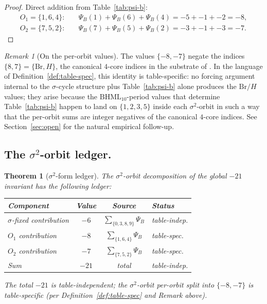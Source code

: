 \documentclass[11pt,reqno]{amsart}
\theoremstyle{plain}
\newtheorem{theorem}{Theorem}[section]
\theoremstyle{definition}
\theoremstyle{remark}
\newtheorem*{remark}{Remark}
\newcommand{\BH}{\mathrm{BHML}}
\newcommand{\sig}{\sigma}
\begin{document}
\begin{proof}
Direct addition from Table~\ref{tab:psi-b}:
\begin{align*}
O_{1} = \{1, 6, 4\}: &\quad
\Psi_{B}(1) + \Psi_{B}(6) + \Psi_{B}(4)
= -5 + -1 + -2 = -8, \\
O_{2} = \{7, 5, 2\}: &\quad
\Psi_{B}(7) + \Psi_{B}(5) + \Psi_{B}(2)
= -3 + -1 + -3 = -7.
\end{align*}
\end{proof}

\begin{remark}[On the per-orbit values]
The values $\{-8, -7\}$ negate the indices $\{8, 7\} =
\{\mathrm{Br}, H\}$, the canonical $4$-core indices in the substrate of
\cite{SandersGishFourCore}.  In the language of
Definition~\ref{def:table-spec}, this identity is table-specific:
no forcing argument internal to the $\sig$-cycle structure plus
Table~\ref{tab:psi-b} alone produces the $\mathrm{Br}/H$ values; they
arise because the $\BH_{10}$-period values that determine
Table~\ref{tab:psi-b} happen to land on $\{1, 2, 3, 5\}$ inside each
$\sig^{2}$-orbit in such a way that the per-orbit sums are integer
negatives of the canonical $4$-core indices.  See Section~\ref{sec:open}
for the natural empirical follow-up.
\end{remark}

\subsection{The $\sig^{2}$-orbit ledger.}
\begin{theorem}[$\sig^{2}$-form ledger]\label{thm:cm-sigma2}
The $\sig^{2}$-orbit decomposition of the global $-21$ invariant has
the following ledger:
\begin{center}
\begin{tabular}{l c c l}
\toprule
Component & Value & Source & Status \\
\midrule
$\sig$-fixed contribution & $-6$ & $\sum_{\{0,3,8,9\}} \Psi_B$ & table-indep. \\
$O_{1}$ contribution      & $-8$ & $\sum_{\{1,6,4\}}\Psi_B$    & table-spec.\\
$O_{2}$ contribution      & $-7$ & $\sum_{\{7,5,2\}}\Psi_B$    & table-spec.\\
\midrule
Sum                       & $-21$ & total                       & table-indep. \\
\bottomrule
\end{tabular}
\end{center}
The total $-21$ is table-independent; the $\sig^{2}$-orbit per-orbit
split into $\{-8, -7\}$ is table-specific (per
Definition~\ref{def:table-spec} and Remark above).
\end{theorem}
\end{document}
